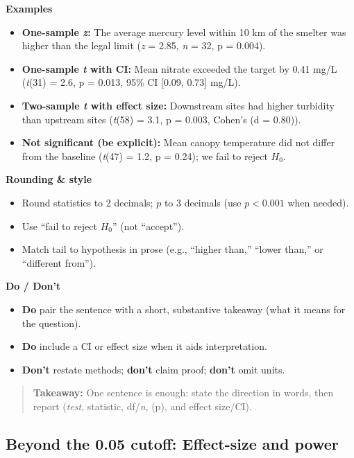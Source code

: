 \documentclass[
  letterpaper,
  DIV=11,
  numbers=noendperiod]{scrreprt}
\providecommand{\tightlist}{%
  \setlength{\itemsep}{0pt}\setlength{\parskip}{0pt}}
\begin{document}
\textbf{Examples}

\begin{itemize}
\item
  \textbf{One-sample \emph{z}:} The average mercury level within 10 km
  of the smelter was higher than the legal limit (\emph{z} = 2.85,
  \emph{n} = 32, p = 0.004).
\item
  \textbf{One-sample \emph{t} with CI:} Mean nitrate exceeded the target
  by 0.41 mg/L (\emph{t}(31) = 2.6, p = 0.013, 95\% CI {[}0.09, 0.73{]}
  mg/L).
\item
  \textbf{Two-sample \emph{t} with effect size:} Downstream sites had
  higher turbidity than upstream sites (\emph{t}(58) = 3.1, p = 0.003,
  Cohen's (d = 0.80)).
\item
  \textbf{Not significant (be explicit):} Mean canopy temperature did
  not differ from the baseline (\emph{t}(47) = 1.2, p = 0.24); we fail
  to reject \(H_0\).
\end{itemize}

\textbf{Rounding \& style}

\begin{itemize}
\tightlist
\item
  Round statistics to 2 decimals; \(p\) to 3 decimals (use \(p<0.001\)
  when needed).
\item
  Use ``fail to reject \(H_0\)'' (not ``accept'').
\item
  Match tail to hypothesis in prose (e.g., ``higher than,'' ``lower
  than,'' or ``different from'').
\end{itemize}

\textbf{Do / Don't}

\begin{itemize}
\tightlist
\item
  \textbf{Do} pair the sentence with a short, substantive takeaway (what
  it means for the question).
\item
  \textbf{Do} include a CI or effect size when it aids interpretation.
\item
  \textbf{Don't} restate methods; \textbf{don't} claim proof;
  \textbf{don't} omit units.
\end{itemize}

\begin{quote}
\textbf{Takeaway:} One sentence is enough: state the direction in words,
then report (\emph{test}, statistic, df/\emph{n}, (p), and effect
size/CI).
\end{quote}

\subsection{Beyond the 0.05 cutoff: Effect-size and
power}\label{beyond-the-0.05-cutoff-effect-size-and-power}
\end{document}
